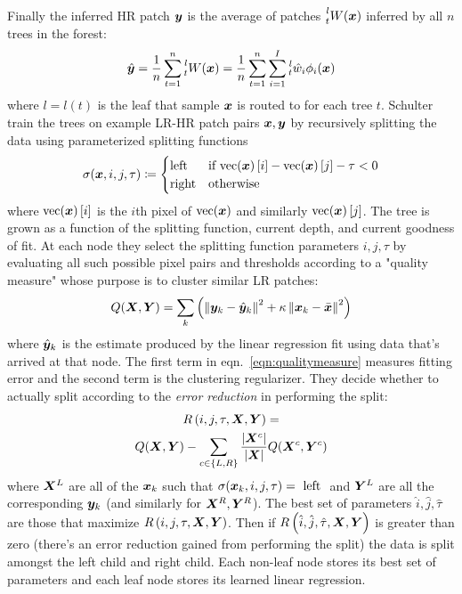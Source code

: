 %
Finally the inferred HR patch $\bm{y}$ is the average of patches $\prescript{l}{t}{W(\bm{x})}$ inferred by all $n$ trees in the forest:
\begin{equation}
    \hat{\bm{y}} = \frac{1}{n} \sum_{t=1}^{n} \prescript{l}{t}{W(\bm{x})} =  \frac{1}{n} \sum_{t=1}^{n} \sum_{i=1}^I \prescript{l}{t}{\hat{w}_i}\phi_i(\bm{x})
\end{equation}
where $l = l(t)$ is the leaf that sample $\bm{x}$ is routed to for each tree $t$.
%
Schulter \etal train the trees on example LR-HR patch pairs $\bm{x}, \bm{y}$ by recursively splitting the data using parameterized splitting functions
\begin{equation}
    \sigma(\bm{x}, i, j, \tau)\coloneqq {
    \begin{cases}
        \text{left} & \text{if } \text{vec}(\bm{x})\left[ i \right] - \text{vec}(\bm{x})\left[ j \right] - \tau < 0  \\
        \text{right} & \text{otherwise}
    \end{cases}
    }
\end{equation}
where $\text{vec}(\bm{x})\left[ i \right]$ is the $i$th pixel of $\text{vec}(\bm{x})$ and similarly $\text{vec}(\bm{x})\left[ j \right]$.
%
The tree is grown as a function of the splitting function, current depth, and current goodness of fit.
%
At each node they select the splitting function parameters $i, j, \tau$ by evaluating all such possible pixel pairs and thresholds according to a "quality measure" whose purpose is to cluster similar LR patches:
\begin{equation}
    Q(\bX, \bY) = \sum_k \left( \left\| \by_k - \hat{\by}_k \right\|^2 + \kappa\left\| \bx_k - \bar{\bx} \right\|^2 \right)
    \label{eqn:qualitymeasure}
\end{equation}
where $\hat{\bm{y}}_k$ is the estimate produced by the linear regression fit using data that's arrived at that node.
%
The first term in eqn.~\ref{eqn:qualitymeasure} measures fitting error and the second term is the clustering regularizer.
%
They decide whether to actually split according to the \textit{error reduction} in performing the split:
\begin{multline*}
    R\left(i, j, \tau, \bm{X}, \bm{Y} \right) = \\ Q(\bm{X}, \bm{Y}) - \sum_{c\in\left\{L, R\right\}} \frac{|\bm{X}^c|}{|\bm{X}|} Q(\bm{X}^c, \bm{Y}^c)
\end{multline*}
where $\bm{X}^L$ are all of the $\bm{x}_k$ such that $\sigma(\bm{x}_k, i, j, \tau) = \text{ left }$ and $\bm{Y}^L$ are all the corresponding $\bm{y}_k$ (and similarly for $\bm{X}^R, \bm{Y}^R$).
%
The best set of parameters $\hat{i}, \hat{j}, \hat{\tau}$ are those that maximize $R\left(i, j, \tau, \bm{X}, \bm{Y} \right)$.
%
Then if $R\left(\hat{i}, \hat{j}, \hat{\tau}, \bm{X}, \bm{Y} \right)$ is greater than zero (there's an error reduction gained from performing the split) the data is split amongst the left child and right child.
%
Each non-leaf node stores its best set of parameters and each leaf node stores its learned linear regression.